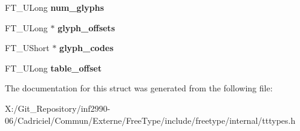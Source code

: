 \begin{DoxyCompactItemize}
\item 
\hypertarget{struct_t_t___s_bit___range_rec___afd9437150f8d9f784f98da6d61223464}{F\-T\-\_\-\-U\-Long {\bfseries num\-\_\-glyphs}}\label{struct_t_t___s_bit___range_rec___afd9437150f8d9f784f98da6d61223464}

\item 
\hypertarget{struct_t_t___s_bit___range_rec___a475f649f101b5886cc2443934e6aa9ca}{F\-T\-\_\-\-U\-Long $\ast$ {\bfseries glyph\-\_\-offsets}}\label{struct_t_t___s_bit___range_rec___a475f649f101b5886cc2443934e6aa9ca}

\item 
\hypertarget{struct_t_t___s_bit___range_rec___ad40d4aa7e48bdb4ab8c98850f1bba178}{F\-T\-\_\-\-U\-Short $\ast$ {\bfseries glyph\-\_\-codes}}\label{struct_t_t___s_bit___range_rec___ad40d4aa7e48bdb4ab8c98850f1bba178}

\item 
\hypertarget{struct_t_t___s_bit___range_rec___a54457937305b5ccf895f5b23c0cc6006}{F\-T\-\_\-\-U\-Long {\bfseries table\-\_\-offset}}\label{struct_t_t___s_bit___range_rec___a54457937305b5ccf895f5b23c0cc6006}

\end{DoxyCompactItemize}


The documentation for this struct was generated from the following file\-:\begin{DoxyCompactItemize}
\item 
X\-:/\-Git\-\_\-\-Repository/inf2990-\/06/\-Cadriciel/\-Commun/\-Externe/\-Free\-Type/include/freetype/internal/tttypes.\-h\end{DoxyCompactItemize}
